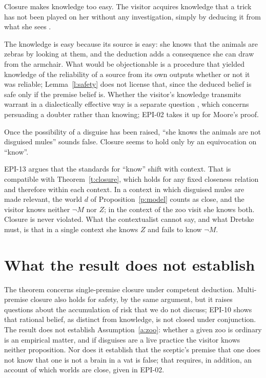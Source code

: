 \documentclass{situationist-preprint}
\begin{document}
\begin{objection}
Closure makes knowledge too easy. The visitor acquires knowledge that a trick has not been played on her without any investigation, simply by deducing it from what she sees \citep{Cohen2002}.
\end{objection}

\begin{reply}
The knowledge is easy because its source is easy: she knows that the animals are zebras by looking at them, and the deduction adds a consequence she can draw from the armchair. What would be objectionable is a procedure that yielded knowledge of the reliability of a source from its own outputs whether or not it was reliable; Lemma~\ref{l:safety} does not license that, since the deduced belief is safe only if the premise belief is. Whether the visitor's knowledge transmits warrant in a dialectically effective way is a separate question \citep{Wright2002}, which concerns persuading a doubter rather than knowing; EPI-02 takes it up for Moore's proof.
\end{reply}

\begin{objection}[Context]
Once the possibility of a disguise has been raised, \enquote{she knows the animals are not disguised mules} sounds false. Closure seems to hold only by an equivocation on \enquote{know}.
\end{objection}

\begin{reply}
EPI-13 argues that the standards for \enquote{know} shift with context. That is compatible with Theorem~\ref{t:closure}, which holds for any fixed closeness relation and therefore within each context. In a context in which disguised mules are made relevant, the world $d$ of Proposition~\ref{p:model} counts as close, and the visitor knows neither $\neg M$ nor $Z$; in the context of the zoo visit she knows both. Closure is never violated. What the contextualist cannot say, and what Dretske must, is that in a single context she knows $Z$ and fails to know $\neg M$.
\end{reply}

\section{What the result does not establish}

The theorem concerns single-premise closure under competent deduction. Multi-premise closure also holds for safety, by the same argument, but it raises questions about the accumulation of risk that we do not discuss; EPI-10 shows that rational belief, as distinct from knowledge, is not closed under conjunction. The result does not establish Assumption~\ref{a:zoo}: whether a given zoo is ordinary is an empirical matter, and if disguises are a live practice the visitor knows neither proposition. Nor does it establish that the sceptic's premise that one does not know that one is not a brain in a vat is false; that requires, in addition, an account of which worlds are close, given in EPI-02.
\end{document}
